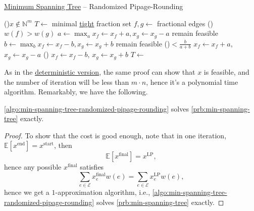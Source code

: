 \begin{algorithm}[H]\label{algo:min-spanning-tree-randomized-pipage-rounding}
	\DontPrintSemicolon
	\caption{\hyperref[prb:min-spanning-tree]{Minimum Spanning Tree} -- Randomized Pipage-Rounding}
	\BlankLine
	\While(){\(x \notin \mathbb{N} ^{m}\)}{
		\(T\gets\) minimal \hyperref[not:tight]{tight} fraction set
		\(f, g\gets \) fractional edges\label{algo:min-spanning-tree-randomized-pipage-rounding-fg}
		\If(){\(w(f) > w(g)\)}{
			\;
		}
		\(a\gets \max_a x_f \gets x_f + a, x_g \gets x_g - a\) remain feasible
		\(b\gets \max_b x_f \gets x_f - b, x_g \gets x_g + b\) remain feasible
		\uIf(){\(< \frac{b}{a + b}\)}{
			\(x_f \gets x_f + a\), \(x_g \gets x_g - a\)\;
		}\Else(){
			\(x_f \gets x_f - b\), \(x_g \gets x_g + b\)\;
		}
	}
	\(T\gets\)
	\;
\end{algorithm}

As in the \hyperref[algo:min-spanning-tree-pipage-rounding]{deterministic version}, the same proof can show that \(x\) is feasible, and the number of iteration will be less than \(m \cdot n\), hence it's a polynomial time algorithm. Remarkably, we have the following.

\begin{theorem}
	\autoref{algo:min-spanning-tree-randomized-pipage-rounding} solves \autoref{prb:min-spanning-tree} exactly.
\end{theorem}
\begin{proof}
	To show that the cost is good enough, note that in one iteration, \(\mathbb{E}\left[x^{\text{end} } \right] = x^{\text{start} }\), then
	\[
		\mathbb{E}\left[ x^{\text{final}} \right] = x^{\text{LP} },
	\]
	hence any possible \(x^{\text{final} }\) satisfies
	\[
		\sum_{e\in \mathcal{E} } x^{\text{final}}_e w(e)= \sum_{e\in \mathcal{E} } x_e^{\text{LP}} w(e),
	\]
	hence we get a \(1\)-approximation algorithm, i.e., \autoref{algo:min-spanning-tree-randomized-pipage-rounding} solves \autoref{prb:min-spanning-tree} exactly.
\end{proof}

